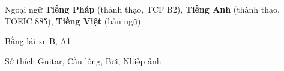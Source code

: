 

\begin{cvskills}

  \cvskill
    {Ngoại ngữ} %
    {\textbf{Tiếng Pháp} (thành thạo, TCF B2), \textbf{Tiếng Anh} (thành thạo, TOEIC 885), \textbf{Tiếng Việt} (bản ngữ)} %

  \cvskill
    {Bằng lái xe} %
    {B, A1} %

  \cvskill
    {Sở thích} %
    {Guitar, Cầu lông, Bơi, Nhiếp ảnh} %

\end{cvskills}

